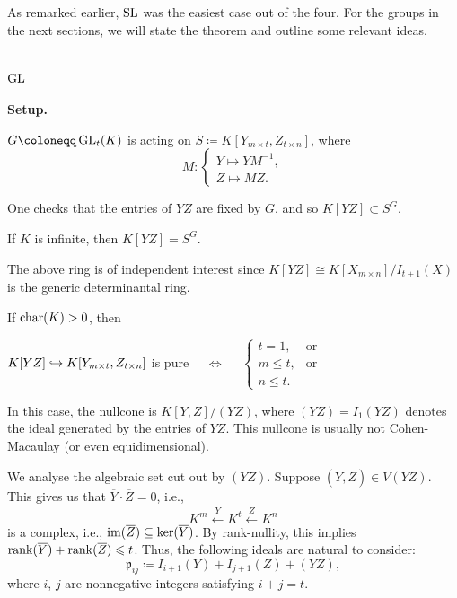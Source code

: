 \documentclass[12pt]{article}
\begin{document}
As remarked earlier, $\operatorname{SL}$ was the easiest case out of the four. For the groups in the next sections, we will state the theorem and outline some relevant ideas.

\section{\texorpdfstring{$\operatorname{GL}$}{GL}}

\begin{tcolorbox}[parbox=false]
	\textbf{Setup.} 

	$G \coloneqq \GL_{t}(K)$ is acting on $S \coloneqq K[Y_{m \times t}, Z_{t \times n}]$, where 
	\begin{equation*} 
		M : 
		\begin{cases}
			Y \mapsto YM^{-1}, \\
			Z \mapsto MZ.
		\end{cases}
	\end{equation*}
\end{tcolorbox}

One checks that the entries of $YZ$ are fixed by $G$, and so $K[YZ] \subset S^{G}$.

\begin{thm}
	If $K$ is infinite, then $K[YZ] = S^{G}$.
\end{thm}

The above ring is of independent interest since $K[YZ] \cong K[X_{m \times n}]/I_{t + 1}(X)$ is the generic determinantal ring.

\begin{thm}
	If $\operatorname{char}(K) > 0$, then
	\begin{center} 
		$K[YZ] \hookrightarrow K[Y_{m \times t}, Z_{t \times n}]$ is pure $\quad\Leftrightarrow\quad$ 
		$\begin{cases}
			t = 1, & \text{or} \\
			m \le t, & \text{or} \\
			n \le t.
		\end{cases}$
	\end{center}
\end{thm}

In this case, the nullcone is $K[Y, Z]/(YZ)$, where $(YZ) = I_{1}(YZ)$ denotes the ideal generated by the entries of $YZ$. This nullcone is usually not Cohen-Macaulay (or even equidimensional). 

We analyse the algebraic set cut out by $(YZ)$. Suppose $(\overline{Y}, \overline{Z}) \in V(YZ)$. This gives us that $\overline{Y} \cdot \overline{Z} = 0$, i.e.,
\begin{equation*} 
	K^{m} \xleftarrow{\overline{Y}} K^{t} \xleftarrow{\overline{Z}} K^{n}
\end{equation*}
is a complex, i.e., $\operatorname{im}(\overline{Z}) \subseteq \ker(\overline{Y})$. By rank-nullity, this implies $\operatorname{rank}(\overline{Y}) + \operatorname{rank}(\overline{Z}) \leqslant t$. Thus, the following ideals are natural to consider:
\begin{equation*} 
	\mathfrak{p}_{ij} \coloneqq I_{i + 1}(Y) + I_{j + 1}(Z) + (YZ),
\end{equation*}
where $i$, $j$ are nonnegative integers satisfying $i + j = t$. 
\end{document}
